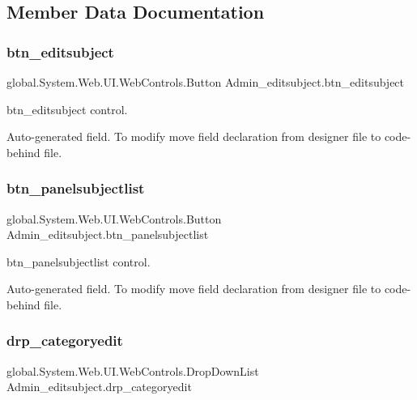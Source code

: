 \subsection{Member Data Documentation}
\mbox{\label{class_admin__editsubject_aa9712a3ce6855a9762d7bd17e99f1314}} 
\subsubsection{\texorpdfstring{btn\_editsubject}{btn\_editsubject}}
{\footnotesize\ttfamily global.\+System.\+Web.\+U\+I.\+Web\+Controls.\+Button Admin\+\_\+editsubject.\+btn\+\_\+editsubject\hspace{0.3cm}{\ttfamily [protected]}}



btn\+\_\+editsubject control. 

Auto-\/generated field. To modify move field declaration from designer file to code-\/behind file. \mbox{\label{class_admin__editsubject_a55f0496f3ffe95f8f48d117d56d1908a}} 
\subsubsection{\texorpdfstring{btn\_panelsubjectlist}{btn\_panelsubjectlist}}
{\footnotesize\ttfamily global.\+System.\+Web.\+U\+I.\+Web\+Controls.\+Button Admin\+\_\+editsubject.\+btn\+\_\+panelsubjectlist\hspace{0.3cm}{\ttfamily [protected]}}



btn\+\_\+panelsubjectlist control. 

Auto-\/generated field. To modify move field declaration from designer file to code-\/behind file. \mbox{\label{class_admin__editsubject_a1bf202806a0f9ce75581ef065ebc9494}} 
\subsubsection{\texorpdfstring{drp\_categoryedit}{drp\_categoryedit}}
{\footnotesize\ttfamily global.\+System.\+Web.\+U\+I.\+Web\+Controls.\+Drop\+Down\+List Admin\+\_\+editsubject.\+drp\+\_\+categoryedit\hspace{0.3cm}{\ttfamily [protected]}}



